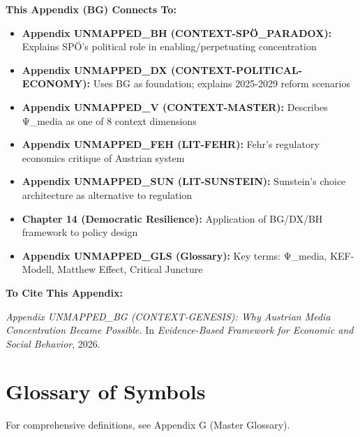{\begin{tcolorbox}[colback=orange!5!white, colframe=orange!75!black,
    title=Cross-Reference Links]

\textbf{This Appendix (BG) Connects To:}

\begin{itemize}[nosep]
\item \textbf{Appendix UNMAPPED_BH (CONTEXT-SPÖ_PARADOX):} Explains SPÖ's political role in enabling/perpetuating concentration
\item \textbf{Appendix UNMAPPED_DX (CONTEXT-POLITICAL-ECONOMY):} Uses BG as foundation; explains 2025-2029 reform scenarios
\item \textbf{Appendix UNMAPPED_V (CONTEXT-MASTER):} Describes Ψ_media as one of 8 context dimensions
\item \textbf{Appendix UNMAPPED_FEH (LIT-FEHR):} Fehr's regulatory economics critique of Austrian system
\item \textbf{Appendix UNMAPPED_SUN (LIT-SUNSTEIN):} Sunstein's choice architecture as alternative to regulation
\item \textbf{Chapter 14 (Democratic Resilience):} Application of BG/DX/BH framework to policy design
\item \textbf{Appendix UNMAPPED_GLS (Glossary):} Key terms: Ψ_media, KEF-Modell, Matthew Effect, Critical Juncture
\end{itemize}

\textbf{To Cite This Appendix:}

\textit{Appendix UNMAPPED_BG (CONTEXT-GENESIS): Why Austrian Media Concentration Became Possible.}
In \textit{Evidence-Based Framework for Economic and Social Behavior}, 2026.

\end{tcolorbox}



\section{Glossary of Symbols}
\label{sec:bg-glossary}

For comprehensive definitions, see Appendix G (Master Glossary).

}
